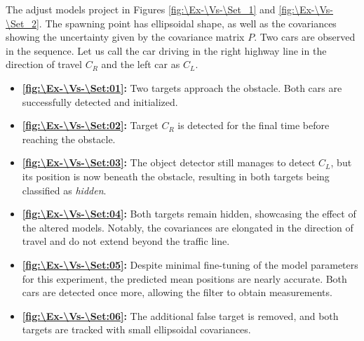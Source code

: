 The adjust models project in Figures \ref{fig:\Ex-\Vs-\Set_1} and \ref{fig:\Ex-\Vs-\Set_2}. The spawning point has
ellipsoidal shape, as well as the covariances showing the uncertainty given by the covariance matrix $P$. Two cars
are observed in the sequence. Let us call the car driving in the right highway line in the direction of travel $C_R$
and the left car as $C_L$.

\begin{itemize}
    \item \textbf{\ref{fig:\Ex-\Vs-\Set:01}:} Two targets approach the obstacle. Both cars are successfully detected and initialized.
    \item \textbf{\ref{fig:\Ex-\Vs-\Set:02}:} Target $C_R$ is detected for the final time before reaching the obstacle.
    \item \textbf{\ref{fig:\Ex-\Vs-\Set:03}:} The object detector still manages to detect $C_L$, but its position is now beneath the obstacle, resulting in both targets being classified as \textit{hidden}.
    \item \textbf{\ref{fig:\Ex-\Vs-\Set:04}:} Both targets remain hidden, showcasing the effect of the altered models. Notably, the covariances are elongated in the direction of travel and do not extend beyond the traffic line.
    \item \textbf{\ref{fig:\Ex-\Vs-\Set:05}:} Despite minimal fine-tuning of the model parameters for this experiment, the predicted mean positions are nearly accurate. Both cars are detected once more, allowing the filter to obtain measurements.
    \item \textbf{\ref{fig:\Ex-\Vs-\Set:06}:} The additional false target is removed, and both targets are tracked with small ellipsoidal covariances.
\end{itemize}


